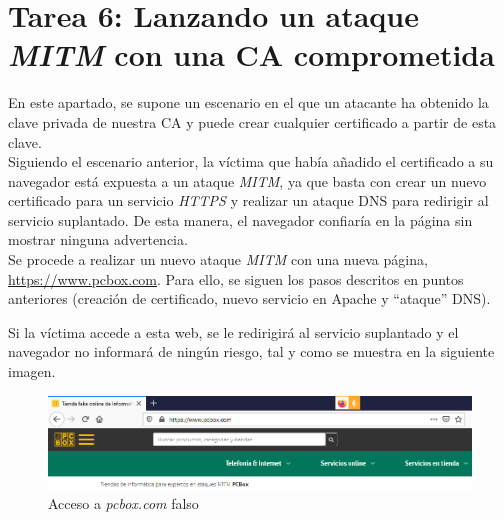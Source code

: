 \documentclass[10pt,a4paper]{article}
\begin{document}
\section{Tarea 6: Lanzando un ataque \emph{MITM} con una CA comprometida}

En este apartado, se supone un escenario en el que un atacante ha obtenido la clave privada de nuestra CA y puede crear cualquier certificado a partir de esta clave. \\
Siguiendo el escenario anterior, la víctima que había añadido el certificado a su navegador está expuesta a un ataque \textit{MITM}, ya que basta con crear un nuevo certificado para un servicio \textit{HTTPS} y realizar un ataque DNS para redirigir al servicio suplantado. De esta manera, el navegador confiaría en la página sin mostrar ninguna advertencia. \\
Se procede a realizar un nuevo ataque \textit{MITM} con una nueva página, \url{https://www.pcbox.com}. Para ello, se siguen los pasos descritos en puntos anteriores (creación de certificado, nuevo servicio en Apache y ``ataque'' DNS). \par
Si la víctima accede a esta web, se le redirigirá al servicio suplantado y el navegador no informará de ningún riesgo, tal y como se muestra en la siguiente imagen. 

\begin{figure}[h!]
	\centering
	\includegraphics[scale=0.6]{images/Tarea6.png}
	\caption{Acceso a \textit{pcbox.com } falso}
	\label{fig:Tarea6}
\end{figure}
\end{document}

